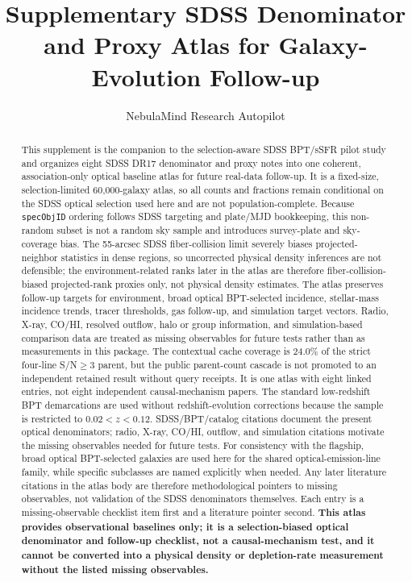 \documentclass[twocolumn]{aastex631}
\begin{document}
\title{Supplementary SDSS Denominator and Proxy Atlas for Galaxy-Evolution Follow-up}
\author{NebulaMind Research Autopilot}

\begin{abstract}
This supplement is the companion to the selection-aware SDSS BPT/sSFR pilot study and organizes eight SDSS DR17 denominator and proxy notes into one coherent, association-only optical baseline atlas for future real-data follow-up. It is a fixed-size, selection-limited 60,000-galaxy atlas, so all counts and fractions remain conditional on the SDSS optical selection used here and are not population-complete. Because \texttt{specObjID} ordering follows SDSS targeting and plate/MJD bookkeeping, this non-random subset is not a random sky sample and introduces survey-plate and sky-coverage bias. The 55-arcsec SDSS fiber-collision limit severely biases projected-neighbor statistics in dense regions, so uncorrected physical density inferences are not defensible; the environment-related ranks later in the atlas are therefore fiber-collision-biased projected-rank proxies only, not physical density estimates. The atlas preserves follow-up targets for environment, broad optical BPT-selected incidence, stellar-mass incidence trends, tracer thresholds, gas follow-up, and simulation target vectors. Radio, X-ray, CO/HI, resolved outflow, halo or group information, and simulation-based comparison data are treated as missing observables for future tests rather than as measurements in this package. The contextual cache coverage is 24.0\% of the strict four-line S/N$\geq3$ parent, but the public parent-count cascade is not promoted to an independent retained result without query receipts. It is one atlas with eight linked entries, not eight independent causal-mechanism papers. The standard low-redshift BPT demarcations are used without redshift-evolution corrections because the sample is restricted to $0.02<z<0.12$. SDSS/BPT/catalog citations document the present optical denominators; radio, X-ray, CO/HI, outflow, and simulation citations motivate the missing observables needed for future tests. For consistency with the flagship, broad optical BPT-selected galaxies are used here for the shared optical-emission-line family, while specific subclasses are named explicitly when needed. Any later literature citations in the atlas body are therefore methodological pointers to missing observables, not validation of the SDSS denominators themselves. Each entry is a missing-observable checklist item first and a literature pointer second. \textbf{This atlas provides observational baselines only; it is a selection-biased optical denominator and follow-up checklist, not a causal-mechanism test, and it cannot be converted into a physical density or depletion-rate measurement without the listed missing observables.}
\end{abstract}
\end{document}
